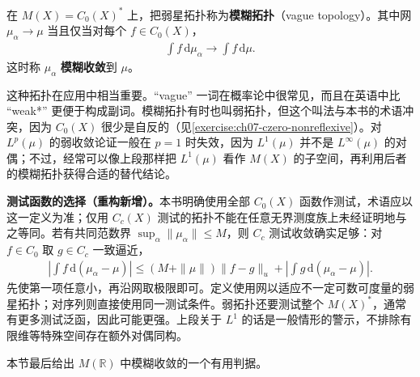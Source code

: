 \documentclass[../../main.tex]{subfiles}
\begin{document}
\begin{definition}[模糊拓扑与模糊收敛]\label{definition:ch07-vague-topology}
在 $M(X)=C_0(X)^*$ 上，把弱星拓扑称为\textbf{模糊拓扑}（vague topology）。其中网 $\mu_\alpha\to\mu$ 当且仅当对每个 $f\in C_0(X)$，
\begin{align*}
\int f\,\mathrm d\mu_\alpha\longrightarrow\int f\,\mathrm d\mu.
\end{align*}
这时称 $\mu_\alpha$ \textbf{模糊收敛}到 $\mu$。
\end{definition}
这种拓扑在应用中相当重要。“vague” 一词在概率论中很常见，而且在英语中比 “weak*” 更便于构成副词。模糊拓扑有时也叫弱拓扑，但这个叫法与本书的术语冲突，因为 $C_0(X)$ 很少是自反的（见\cref{exercise:ch07-czero-nonreflexive}）。对 $L^p(\mu)$ 的弱收敛论证一般在 $p=1$ 时失效，因为 $L^1(\mu)$ 并不是 $L^\infty(\mu)$ 的对偶；不过，经常可以像上段那样把 $L^1(\mu)$ 看作 $M(X)$ 的子空间，再利用后者的模糊拓扑获得合适的替代结论。
\begin{remark}
\textbf{测试函数的选择（重构新增）。}本书明确使用全部 $C_0(X)$ 函数作测试，术语应以这一定义为准；仅用 $C_c(X)$ 测试的拓扑不能在任意无界测度族上未经证明地与之等同。若有共同范数界 $\sup_\alpha\|\mu_\alpha\|\leqslant M$，则 $C_c$ 测试收敛确实足够：对 $f\in C_0$ 取 $g\in C_c$ 一致逼近，
\begin{align*}
\left|\int f\,\mathrm d(\mu_\alpha-\mu)\right|
\leqslant(M+\|\mu\|)\|f-g\|_u+
\left|\int g\,\mathrm d(\mu_\alpha-\mu)\right|.
\end{align*}
先使第一项任意小，再沿网取极限即可。定义使用网以适应不一定可数可度量的弱星拓扑；对序列则直接使用同一测试条件。弱拓扑还要测试整个 $M(X)^*$，通常有更多测试泛函，因此可能更强。上段关于 $L^1$ 的话是一般情形的警示，不排除有限维等特殊空间存在额外对偶同构。
\end{remark}
本节最后给出 $M(\mathbb R)$ 中模糊收敛的一个有用判据。

\end{document}
